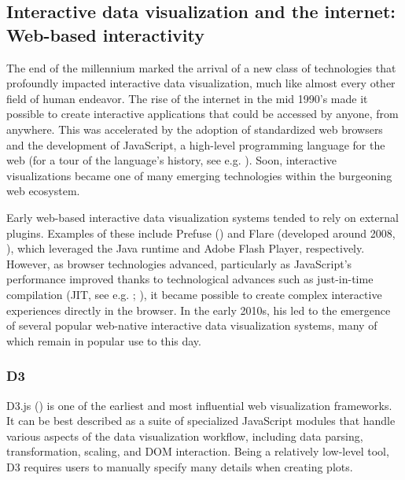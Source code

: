 \documentclass[
  openany]{book}
\theoremstyle{definition}
\theoremstyle{definition}
\theoremstyle{definition}
\theoremstyle{definition}
\theoremstyle{remark}
\begin{document}
\subsection{Interactive data visualization and the internet: Web-based interactivity}\label{web-based}

The end of the millennium marked the arrival of a new class of technologies that profoundly impacted interactive data visualization, much like almost every other field of human endeavor. The rise of the internet in the mid 1990's made it possible to create interactive applications that could be accessed by anyone, from anywhere. This was accelerated by the adoption of standardized web browsers and the development of JavaScript, a high-level programming language for the web (for a tour of the language's history, see e.g. ). Soon, interactive visualizations became one of many emerging technologies within the burgeoning web ecosystem.

Early web-based interactive data visualization systems tended to rely on external plugins. Examples of these include Prefuse () and Flare (developed around 2008, ), which leveraged the Java runtime and Adobe Flash Player, respectively. However, as browser technologies advanced, particularly as JavaScript's performance improved thanks to technological advances such as just-in-time compilation (JIT, see e.g. ; ), it became possible to create complex interactive experiences directly in the browser. In the early 2010s, his led to the emergence of several popular web-native interactive data visualization systems, many of which remain in popular use to this day.

\subsubsection{D3}\label{d3}

D3.js () is one of the earliest and most influential web visualization frameworks. It can be best described as a suite of specialized JavaScript modules that handle various aspects of the data visualization workflow, including data parsing, transformation, scaling, and DOM interaction. Being a relatively low-level tool, D3 requires users to manually specify many details when creating plots.
\end{document}
